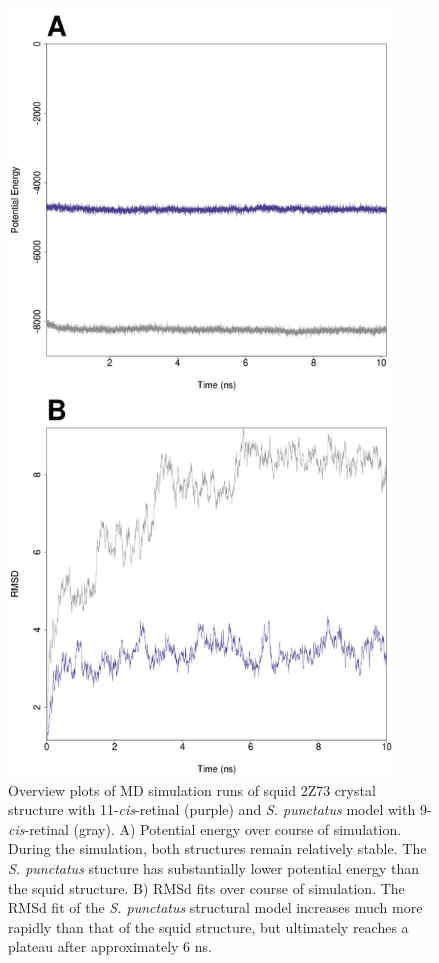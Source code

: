 \begin{figure}[htbp]
  \includegraphics[width=4in]{./Chapter_RhodStruct/img/TpSp_mdoutRMS.png}
  \caption[MD summary plots]{Overview plots of MD simulation runs of squid 2Z73 crystal structure with 11-\textit{cis}-retinal (purple) and \textit{S. punctatus} model with 9-\textit{cis}-retinal (gray). A) Potential energy over course of simulation. During the simulation, both structures remain relatively stable. The \textit{S. punctatus} stucture has substantially lower potential energy than the squid structure. B) RMSd fits over course of simulation. The RMSd fit of the \textit{S. punctatus} structural model increases much more rapidly than that of the squid structure, but ultimately reaches a plateau after approximately 6 ns.}
  \label{fig:ChRhodS_MDEnergyRMSD}
\end{figure}
